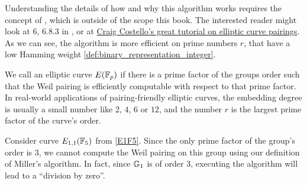 Understanding the details of how and why this algorithm works requires the concept of , which is outside of the scope this book. The interested reader might look at \chaptname{} 6, \secname{} 6.8.3 in \cite{hoffstein-2008}, or at \href{https://static1.squarespace.com/static/5fdbb09f31d71c1227082339/t/5ff394720493bd28278889c6/1609798774687/PairingsForBeginners.pdf}{Craig Costello’s great tutorial on elliptic curve pairings}.  As we can see, the algorithm is more efficient on prime numbers $r$, that have a low Hamming weight \ref{def:binary_representation_integer}.

We call an elliptic curve $E(\mathbb{F}_p)$  if there is a prime factor of the groups order such that the Weil pairing is efficiently computable with respect to that prime factor. In real-world applications of pairing-friendly elliptic curves, the embedding degree is usually a small number like $2$, $4$, $6$ or $12$, and the number $r$ is the largest prime factor of the curve's order. 

\begin{example}Consider curve $E_{1,1}(\mathbb{F}_5)$ from \examplename{} \ref{E1F5}. Since the only prime factor of the group's order is $3$, we cannot compute the Weil pairing on this group using our definition of Miller's algorithm. In fact, since $\mathbb{G}_1$ is of order $3$, executing the algorithm will lead to a ``division by zero''.
\end{example}

